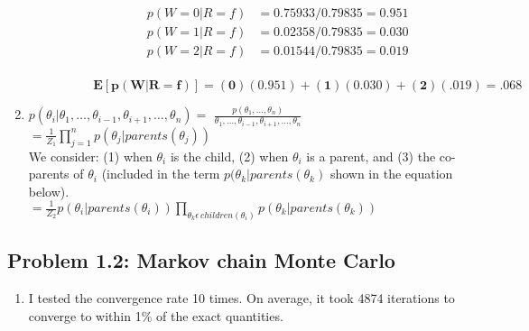 \documentclass{article}
\begin{document}
\begin{enumerate}[label=(\alph*)]
\begin{enumerate}[label=\roman*.]
\begin{enumerate}[label=\alph*.]
\begin{itemize}
\begin{align*}
p(W=0|R=f)&=0.75933/0.79835=0.951 \\
p(W=1|R=f)&=0.02358/0.79835=0.030 \\
p(W=2|R=f)&=0.01544/0.79835=0.019 \\
\end{align*}

$\bm{E[p(W|R=f)]=(0)(0.951)+(1)(0.030)+(2)(.019)=.068}$

\end{itemize}

\end{enumerate}

\end{enumerate}


\item

$p(\theta_i|\theta_1,\text{\ldots},\theta_{i-1},\theta_{i+1},\text{\ldots},\theta_n) = $ 
$\frac{p(\theta_1, \text{\ldots}, \theta_n)} {\theta_1,\text{\ldots},\theta_{i-1},\theta_{i+1},\text{\ldots},\theta_n}$ 
$= \frac{1}{Z_1}\prod_{j=1}^n p(\theta_j|parents(\theta_j))$ \\


We consider: (1) when $\theta_i$ is the child, (2) when $\theta_i$ is a parent, and 
(3) the co-parents of $\theta_i$ (included in the term $p(\theta_k|parents(\theta_k)$ shown in the equation below). \\

$= \frac{1}{Z_2}p(\theta_i|parents(\theta_i)) \prod_{\theta_k \epsilon \, children{(\theta_i)}}p(\theta_k|parents(\theta_k))$



\end{enumerate}

\subsection*{Problem 1.2: Markov chain Monte Carlo}


\begin{enumerate}[label=(d)]

\item I tested the convergence rate 10 times. On average, it took 4874 iterations to converge to within 1\% of the
exact quantities.

\end{enumerate}
\end{document}
